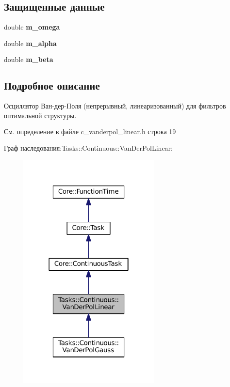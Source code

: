 \subsection*{Защищенные данные}
\begin{DoxyCompactItemize}
\item 
\hypertarget{class_tasks_1_1_continuous_1_1_van_der_pol_linear_a32bc8a8ea2d48bbee7cb368511d19bc5}{}\label{class_tasks_1_1_continuous_1_1_van_der_pol_linear_a32bc8a8ea2d48bbee7cb368511d19bc5} 
double {\bfseries m\+\_\+omega}
\item 
\hypertarget{class_tasks_1_1_continuous_1_1_van_der_pol_linear_a1054e1ea7e2459ac378fddb763077226}{}\label{class_tasks_1_1_continuous_1_1_van_der_pol_linear_a1054e1ea7e2459ac378fddb763077226} 
double {\bfseries m\+\_\+alpha}
\item 
\hypertarget{class_tasks_1_1_continuous_1_1_van_der_pol_linear_adf8894890b4e4a7d05c450ce145d69b9}{}\label{class_tasks_1_1_continuous_1_1_van_der_pol_linear_adf8894890b4e4a7d05c450ce145d69b9} 
double {\bfseries m\+\_\+beta}
\end{DoxyCompactItemize}


\subsection{Подробное описание}
Осциллятор Ван-\/дер-\/Поля (непрерывный, линеаризованный) для фильтров оптимальной структуры. 

См. определение в файле c\+\_\+vanderpol\+\_\+linear.\+h строка 19



Граф наследования\+:Tasks\+:\+:Continuous\+:\+:Van\+Der\+Pol\+Linear\+:
\nopagebreak
\begin{figure}[H]
\begin{center}
\leavevmode
\includegraphics[width=202pt]{class_tasks_1_1_continuous_1_1_van_der_pol_linear__inherit__graph}
\end{center}
\end{figure}


